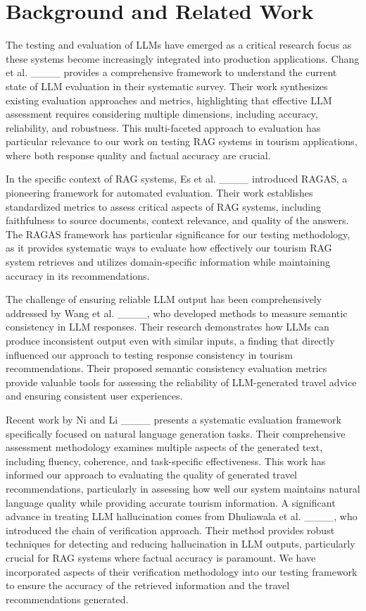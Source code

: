 \section{Background and Related Work}
The testing and evaluation of LLMs have emerged as a critical research focus as these systems become increasingly integrated into production applications. Chang et al. ____ provides a comprehensive framework to understand the current state of LLM evaluation in their systematic survey. Their work synthesizes existing evaluation approaches and metrics, highlighting that effective LLM assessment requires considering multiple dimensions, including accuracy, reliability, and robustness. This multi-faceted approach to evaluation has particular relevance to our work on testing RAG systems in tourism applications, where both response quality and factual accuracy are crucial.


In the specific context of RAG systems, Es et al. ____ introduced RAGAS, a pioneering framework for automated evaluation. Their work establishes standardized metrics to assess critical aspects of RAG systems, including faithfulness to source documents, context relevance, and quality of the answers. The RAGAS framework has particular significance for our testing methodology, as it provides systematic ways to evaluate how effectively our tourism RAG system retrieves and utilizes domain-specific information while maintaining accuracy in its recommendations.



The challenge of ensuring reliable LLM output has been comprehensively addressed by Wang et al. ____, who developed methods to measure semantic consistency in LLM responses. Their research demonstrates how LLMs can produce inconsistent output even with similar inputs, a finding that directly influenced our approach to testing response consistency in tourism recommendations. Their proposed semantic consistency evaluation metrics provide valuable tools for assessing the reliability of LLM-generated travel advice and ensuring consistent user experiences.


Recent work by Ni and Li ____ presents a systematic evaluation framework specifically focused on natural language generation tasks. Their comprehensive assessment methodology examines multiple aspects of the generated text, including fluency, coherence, and task-specific effectiveness. This work has informed our approach to evaluating the quality of generated travel recommendations, particularly in assessing how well our system maintains natural language quality while providing accurate tourism information. A significant advance in treating LLM hallucination comes from Dhuliawala et al. ____, who introduced the chain of verification approach. Their method provides robust techniques for detecting and reducing hallucination in LLM outputs, particularly crucial for RAG systems where factual accuracy is paramount. We have incorporated aspects of their verification methodology into our testing framework to ensure the accuracy of the retrieved information and the travel recommendations generated.

